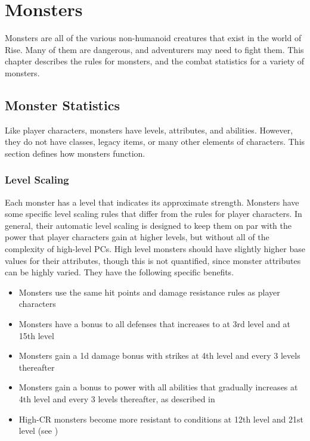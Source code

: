 \chapter{Monsters}

Monsters are all of the various non-humanoid creatures that exist in the world of Rise.
Many of them are dangerous, and adventurers may need to fight them.
This chapter describes the rules for monsters, and the combat statistics for a variety of monsters.

\section{Monster Statistics}
    Like player characters, monsters have levels, attributes, and abilities.
    However, they do not have classes, legacy items, or many other elements of characters.
    This section defines how monsters function.

    \subsection{Level Scaling}
        Each monster has a level that indicates its approximate strength.
        Monsters have some specific level scaling rules that differ from the rules for player characters.
        In general, their automatic level scaling is designed to keep them on par with the power that player characters gain at higher levels, but without all of the complexity of high-level PCs.
        High level monsters should have slightly higher base values for their attributes, though this is not quantified, since monster attributes can be highly varied.
        They have the following specific benefits.
        \begin{itemize}
            \item Monsters use the same hit points and damage resistance rules as player characters
            \item Monsters have a  bonus to all defenses that increases to  at 3rd level and  at 15th level
            \item Monsters gain a \plus1d damage bonus with strikes at 4th level and every 3 levels thereafter
            \item Monsters gain a  bonus to power with all abilities that gradually increases at 4th level and every 3 levels thereafter, as described in 
            \item High-CR monsters become more resistant to conditions at 12th level and 21st level (see )
        \end{itemize}

